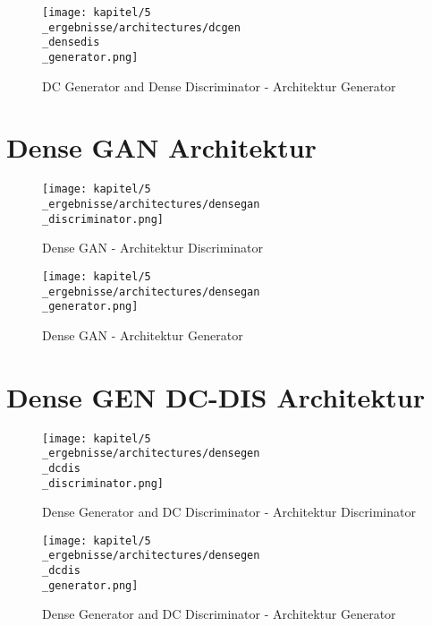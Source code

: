 \begin{figure}[H]
	\centering
	\texttt{[image: kapitel/5\\\_ergebnisse/architectures/dcgen\\\_densedis\\\_generator.png]}
	\caption{DC Generator and Dense Discriminator - Architektur Generator}
	\label{architecture:dcgen-densedis-gen}
\end{figure}

\section{Dense GAN Architektur}
\begin{figure}[H]
	\centering
	\texttt{[image: kapitel/5\\\_ergebnisse/architectures/densegan\\\_discriminator.png]}
	\caption{Dense GAN - Architektur Discriminator}
	\label{architecture:densegan-dis}
\end{figure}

\begin{figure}[H]
	\centering
	\texttt{[image: kapitel/5\\\_ergebnisse/architectures/densegan\\\_generator.png]}
	\caption{Dense GAN - Architektur Generator}
	\label{architecture:densegan-gen}
\end{figure}

\section{Dense GEN DC-DIS Architektur}
\begin{figure}[H]
	\centering
	\texttt{[image: kapitel/5\\\_ergebnisse/architectures/densegen\\\_dcdis\\\_discriminator.png]}
	\caption{Dense Generator and DC Discriminator - Architektur Discriminator}
	\label{architecture:densegen-dcdis-dis}
\end{figure}

\begin{figure}[H]
	\centering
	\texttt{[image: kapitel/5\\\_ergebnisse/architectures/densegen\\\_dcdis\\\_generator.png]}
	\caption{Dense Generator and DC Discriminator - Architektur Generator}
	\label{architecture:densegen-dcdis-gen}
\end{figure}
